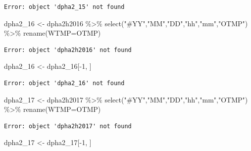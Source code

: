 \documentclass[
  letterpaper,
  DIV=11,
  numbers=noendperiod]{scrreprt}
\newenvironment{Shaded}{\begin{snugshade}}{\end{snugshade}}
\newcommand{\AttributeTok}[1]{\textcolor[rgb]{0.40,0.45,0.13}{#1}}
\newcommand{\DecValTok}[1]{\textcolor[rgb]{0.68,0.00,0.00}{#1}}
\newcommand{\FunctionTok}[1]{\textcolor[rgb]{0.28,0.35,0.67}{#1}}
\newcommand{\NormalTok}[1]{\textcolor[rgb]{0.00,0.23,0.31}{#1}}
\newcommand{\OtherTok}[1]{\textcolor[rgb]{0.00,0.23,0.31}{#1}}
\newcommand{\SpecialCharTok}[1]{\textcolor[rgb]{0.37,0.37,0.37}{#1}}
\newcommand{\StringTok}[1]{\textcolor[rgb]{0.13,0.47,0.30}{#1}}
\begin{document}
\begin{verbatim}
Error: object 'dpha2_15' not found
\end{verbatim}

\begin{Shaded}
\begin{Highlighting}[]
\NormalTok{dpha2\_16 }\OtherTok{\textless{}{-}}\NormalTok{ dpha2h2016 }\SpecialCharTok{\%\textgreater{}\%} \FunctionTok{select}\NormalTok{(}\StringTok{"\#YY"}\NormalTok{,}\StringTok{"MM"}\NormalTok{,}\StringTok{"DD"}\NormalTok{,}\StringTok{"hh"}\NormalTok{,}\StringTok{"mm"}\NormalTok{,}\StringTok{"OTMP"}\NormalTok{) }\SpecialCharTok{\%\textgreater{}\%}
   \FunctionTok{rename}\NormalTok{(}\AttributeTok{WTMP=}\NormalTok{OTMP)}
\end{Highlighting}
\end{Shaded}

\begin{verbatim}
Error: object 'dpha2h2016' not found
\end{verbatim}

\begin{Shaded}
\begin{Highlighting}[]
\NormalTok{dpha2\_16 }\OtherTok{\textless{}{-}}\NormalTok{ dpha2\_16[}\SpecialCharTok{{-}}\DecValTok{1}\NormalTok{, ] }
\end{Highlighting}
\end{Shaded}

\begin{verbatim}
Error: object 'dpha2_16' not found
\end{verbatim}

\begin{Shaded}
\begin{Highlighting}[]
\NormalTok{dpha2\_17 }\OtherTok{\textless{}{-}}\NormalTok{ dpha2h2017 }\SpecialCharTok{\%\textgreater{}\%} \FunctionTok{select}\NormalTok{(}\StringTok{"\#YY"}\NormalTok{,}\StringTok{"MM"}\NormalTok{,}\StringTok{"DD"}\NormalTok{,}\StringTok{"hh"}\NormalTok{,}\StringTok{"mm"}\NormalTok{,}\StringTok{"OTMP"}\NormalTok{) }\SpecialCharTok{\%\textgreater{}\%}
  \FunctionTok{rename}\NormalTok{(}\AttributeTok{WTMP=}\NormalTok{OTMP)}
\end{Highlighting}
\end{Shaded}

\begin{verbatim}
Error: object 'dpha2h2017' not found
\end{verbatim}

\begin{Shaded}
\begin{Highlighting}[]
\NormalTok{dpha2\_17 }\OtherTok{\textless{}{-}}\NormalTok{ dpha2\_17[}\SpecialCharTok{{-}}\DecValTok{1}\NormalTok{, ]}
\end{Highlighting}
\end{Shaded}
\end{document}
